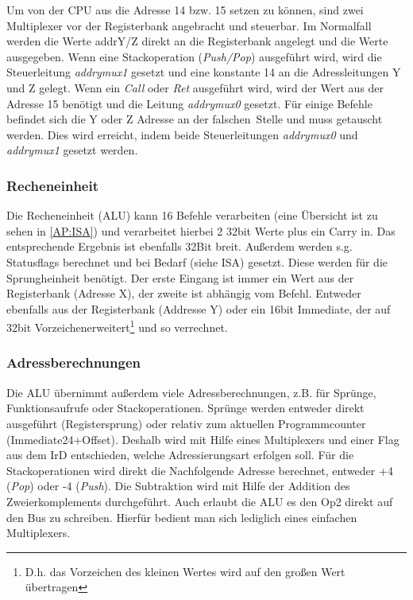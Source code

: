Um von der CPU aus die Adresse 14 bzw. 15 setzen zu können, sind zwei Multiplexer vor der Registerbank angebracht und steuerbar. Im Normalfall werden die Werte addrY/Z direkt an die Registerbank angelegt und die Werte ausgegeben. Wenn eine Stackoperation (\emph{Push/Pop}) ausgeführt wird, wird die Steuerleitung \textit{addrymux1} gesetzt und eine konstante 14 an die Adressleitungen Y und Z gelegt. Wenn ein \emph{Call} oder \emph{Ret} ausgeführt wird, wird der Wert aus der Adresse 15 benötigt und die Leitung \textit{addrymux0} gesetzt. Für einige Befehle befindet sich die Y oder Z Adresse an der \glqq falschen\grqq \ Stelle und muss getauscht werden. Dies wird erreicht, indem beide Steuerleitungen \textit{addrymux0} und \textit{addrymux1} gesetzt werden.

\subsubsection{Recheneinheit}
Die Recheneinheit (ALU) kann 16 Befehle verarbeiten (eine Übersicht ist zu sehen in \autoref{AP:ISA}) und verarbeitet hierbei 2 32bit Werte plus ein Carry in. Das entsprechende Ergebnis ist ebenfalls 32Bit breit. Außerdem werden s.g. Statusflags berechnet und bei Bedarf (siehe ISA) gesetzt. Diese werden für die Sprungheinheit benötigt. Der erste Eingang ist immer ein Wert aus der Registerbank (Adresse X), der zweite ist abhängig vom Befehl. Entweder ebenfalls aus der Registerbank (Addresse Y) oder ein 16bit Immediate, der auf 32bit \glqq Vorzeichenerweitert\grqq \footnote{D.h. das Vorzeichen des kleinen Wertes wird auf den großen Wert übertragen} und so verrechnet.

\subsubsection{Adressberechnungen}
Die ALU übernimmt außerdem viele Adressberechnungen, z.B. für Sprünge, Funktionsaufrufe oder Stackoperationen.
Sprünge werden entweder direkt ausgeführt (Registersprung) oder relativ zum aktuellen Programmcounter (Immediate24+Offset). Deshalb wird mit Hilfe eines Multiplexers und einer Flag aus dem IrD entschieden, welche Adressierungsart erfolgen soll.
Für die Stackoperationen wird direkt die Nachfolgende Adresse berechnet, entweder +4 (\emph{Pop}) oder -4 (\emph{Push}). Die Subtraktion wird mit Hilfe der Addition des Zweierkomplements durchgeführt.
Auch erlaubt die ALU es den Op2 direkt auf den Bus zu schreiben. Hierfür bedient man sich lediglich eines einfachen Multiplexers.

